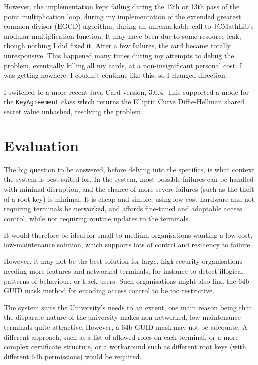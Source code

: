 \documentclass[12pt,a4paper]{article}
\begin{document}
However, the implementation kept failing during the 12th or 13th pass of the point multiplication loop, during my implementation of the extended greatest common divisor (EGCD) algorithm, during an unremarkable call to JCMathLib's modular multiplication function. It may have been due to some resource leak, though nothing I did fixed it. After a few failures, the card became totally unresponsive. This happened many times during my attempts to debug the problem, eventually killing all my cards, at a non-insignificant personal cost. I was getting nowhere. I couldn't continue like this, so I changed direction.

I  switched to a more recent Java Card version, 3.0.4. This supported a mode for the \verb|KeyAgreement| class which returns the Elliptic Curve Diffie-Hellman shared secret value unhashed, resolving the problem.


\pagebreak
\section{Evaluation}
The big question to be answered, before delving into the specifics, is what context the system is best suited for. In the system, most possible failures can be handled with minimal disruption, and the chance of more severe failures (such as the theft of a root key) is minimal. It is cheap and simple, using low-cost hardware and not requiring terminals be networked, and affords fine-tuned and adaptable access control, while not requiring routine updates to the terminals.

It would therefore be ideal for small to medium organisations wanting a low-cost, low-maintenance solution, which supports lots of control and resiliency to failure.

However, it may not be the best solution for large, high-security organisations needing more features and networked terminals, for instance to detect illogical patterns of behaviour, or track users. Such organisations might also find the 64b GUID mask method for encoding access control to be too restrictive.

The system suits the University's needs to an extent, one main reason being that the disparate nature of the university makes non-networked, low-maintenance terminals quite attractive. However, a 64b GUID mask may not be adequate. A different approach, such as a list of allowed roles on each terminal, or a more complex certificate structure, or a workaround such as different root keys (with different 64b permissions) would be required. 
\end{document}

